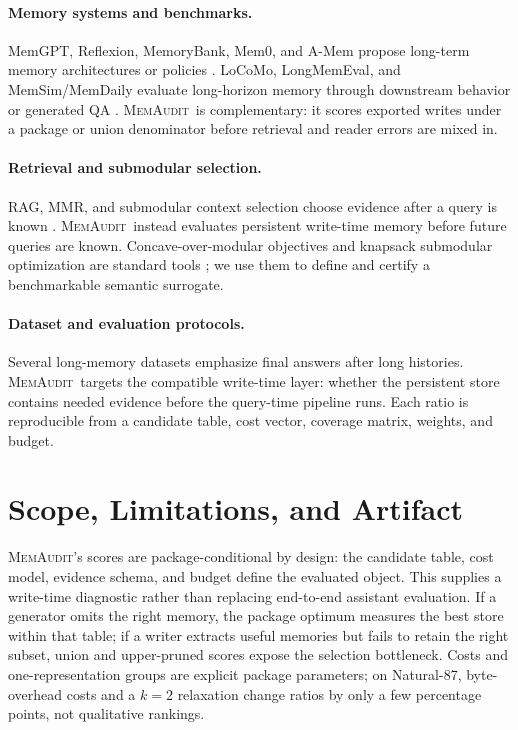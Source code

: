 \documentclass{article}
\theoremstyle{remark}
\theoremstyle{plain}
\newcommand{\method}{\textsc{MemAudit}}
\begin{document}
\paragraph{Memory systems and benchmarks.}
MemGPT, Reflexion, MemoryBank, Mem0, and A-Mem propose long-term memory architectures or policies \cite{packer2023memgpt,shinn2023reflexion,zhong2023memorybank,chhikara2025mem0,xu2025amem}. LoCoMo, LongMemEval, and MemSim/MemDaily evaluate long-horizon memory through downstream behavior or generated QA \cite{maharana2024locomo,wu2024longmemeval,zhang2024memsim}. \method\ is complementary: it scores exported writes under a package or union denominator before retrieval and reader errors are mixed in.

\paragraph{Retrieval and submodular selection.}
RAG, MMR, and submodular context selection choose evidence after a query is known \cite{lewis2020rag,carbonell1998mmr,badanidiyuru2014,kumari2024bumblebee}. \method\ instead evaluates persistent write-time memory before future queries are known. Concave-over-modular objectives and knapsack submodular optimization are standard tools \cite{nemhauser1978,sviridenko2004,huang2017knapsack}; we use them to define and certify a benchmarkable semantic surrogate.

\paragraph{Dataset and evaluation protocols.}
Several long-memory datasets emphasize final answers after long histories. \method\ targets the compatible write-time layer: whether the persistent store contains needed evidence before the query-time pipeline runs. Each ratio is reproducible from a candidate table, cost vector, coverage matrix, weights, and budget.

\section{Scope, Limitations, and Artifact}\label{sec:scope}

\method's scores are package-conditional by design: the candidate table, cost model, evidence schema, and budget define the evaluated object. This supplies a write-time diagnostic rather than replacing end-to-end assistant evaluation. If a generator omits the right memory, the package optimum measures the best store within that table; if a writer extracts useful memories but fails to retain the right subset, union and upper-pruned scores expose the selection bottleneck. Costs and one-representation groups are explicit package parameters; on Natural-87, byte-overhead costs and a $k=2$ relaxation change ratios by only a few percentage points, not qualitative rankings.
\end{document}
